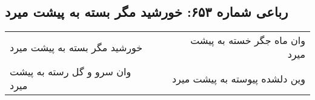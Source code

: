 \begin{center}
\section*{رباعی شماره ۶۵۳: خورشید مگر بسته به پیشت میرد}
\label{sec:0653}
\begin{longtable}{l p{0.5cm} r}
خورشید مگر بسته به پیشت میرد
&&
وان ماه جگر خسته به پیشت میرد
\\
وان سرو و گل رسته به پیشت میرد
&&
وین دلشده پیوسته به پیشت میرد
\\
\end{longtable}
\end{center}
